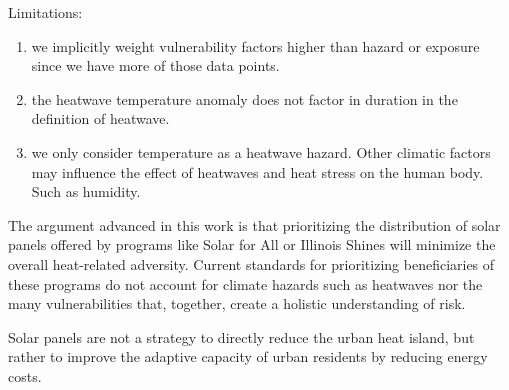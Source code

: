 Limitations:
\begin{enumerate}
  \item we implicitly weight vulnerability factors higher than hazard or exposure since we have more of those data points.
  \item the heatwave temperature anomaly does not factor in duration in the definition
  of heatwave.
  \item we only consider temperature as a heatwave hazard. Other climatic factors
  may influence the effect of heatwaves and heat stress on the human body. Such as
  humidity.
\end{enumerate}

The argument advanced in this work is that prioritizing the distribution of solar
panels offered by programs like Solar for All or Illinois Shines will minimize the
overall heat-related adversity. Current standards for prioritizing beneficiaries
of these programs do not account for climate hazards such as heatwaves nor the
many vulnerabilities that, together, create a holistic understanding of risk.

Solar panels are not a strategy to directly reduce the urban heat island, but rather
to improve the adaptive capacity of urban residents by reducing energy costs.
